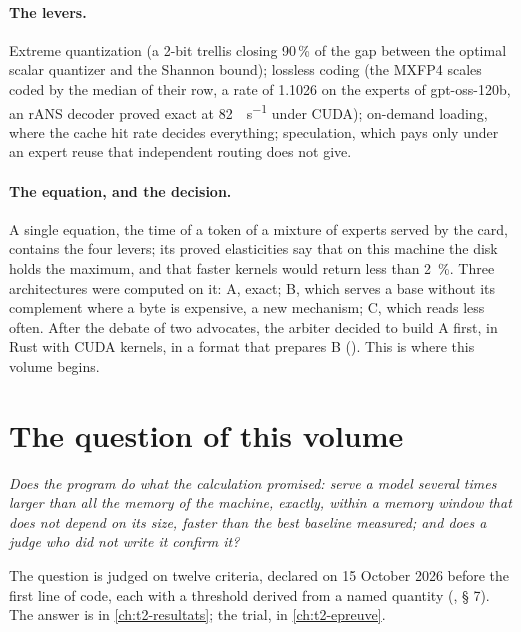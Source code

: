 \paragraph{The levers.} Extreme quantization (a 2-bit trellis closing \num{90}\,\% of the gap between the optimal scalar quantizer and the Shannon bound); lossless coding (the MXFP4 scales coded by the median of their row, a rate of \num{1.1026} on the experts of gpt-oss-120b, an rANS decoder proved exact at \SI{82}{\Go\per\second} under CUDA); on-demand loading, where the cache hit rate decides everything; speculation, which pays only under an expert reuse that independent routing does not give.

\paragraph{The equation, and the decision.} A single equation, the time of a token of a mixture of experts served by the card, contains the four levers; its proved elasticities say that on this machine the disk holds the maximum, and that faster kernels would return less than \SI{2}{\percent}. Three architectures were computed on it: A, exact; B, which serves a base without its complement where a byte is expensive, a new mechanism; C, which reads less often. After the debate of two advocates, the arbiter decided to build A first, in Rust with CUDA kernels, in a format that prepares B (). This is where this volume begins.

\section{The question of this volume}\label{t2i-sec:question}

\begin{center}
\begin{tcolorbox}[enhanced, width=0.92\linewidth, colback=Fond, colframe=Accent, boxrule=0.6pt, arc=1pt]
\emph{Does the program do what the calculation promised: serve a model several times larger than all the memory of the machine, exactly, within a memory window that does not depend on its size, faster than the best baseline measured; and does a judge who did not write it confirm it?}
\end{tcolorbox}
\end{center}

The question is judged on twelve criteria, declared on 15 October 2026 before the first line of code, each with a threshold derived from a named quantity (, § 7). The answer is in \cref{ch:t2-resultats}; the trial, in \cref{ch:t2-epreuve}.

